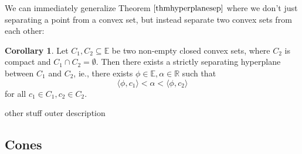 \documentclass{article}
\numberwithin{equation}{section}
\theoremstyle{definition}
\newtheorem{corollary}[theorem]{Corollary}
\newcommand{\bE}{\mathbb{E}}
\newcommand{\bR}{\mathbb{R}}
\begin{document}
We can immediately generalize Theorem $\ref{thmhyperplanesep}$ where we don't just separating a point from a convex set, but instead separate two convex sets from each other:
\begin{corollary}
    Let $C_1, C_2\subseteq\bE$ be two non-empty closed convex sets, where $C_2$ is compact and $C_1\cap C_2=\emptyset$. Then there exists a strictly separating hyperplane between $C_1$ and $C_2$, ie., there exists $\phi\in\bE, \alpha\in\bR$ such that
    \begin{equation}
        \langle \phi,c_1\rangle < \alpha < \langle\phi,c_2\rangle
    \end{equation}
    for all $c_1\in C_1, c_2\in C_2$.
\end{corollary}

other stuff
outer description

\subsection{Cones}
\end{document}
